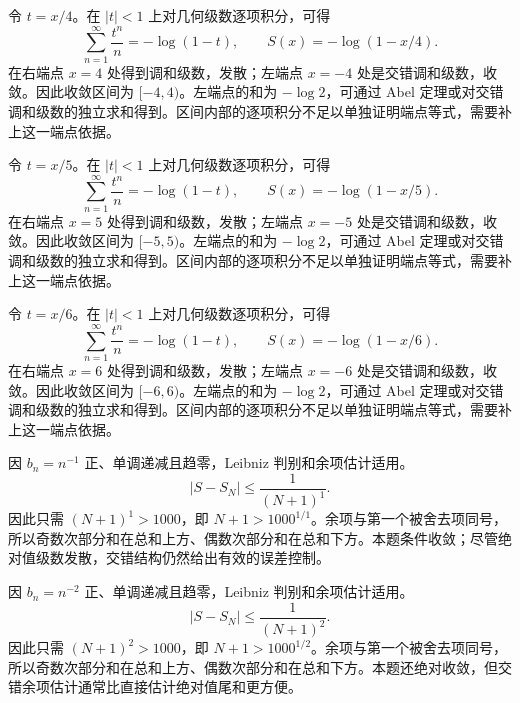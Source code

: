\documentclass[12pt,fontset=fandol]{ctexart}
\begin{document}
\begin{solve}\label{ans:c26q17}
令 $t=x/4$。在 $|t|<1$ 上对几何级数逐项积分，可得
\[
\sum_{n=1}^\infty\frac{t^n}n=-\log(1-t),\qquad S(x)=-\log(1-x/4).
\]
在右端点 $x=4$ 处得到调和级数，发散；左端点 $x=-4$ 处是交错调和级数，收敛。因此收敛区间为 $[-4,4)$。左端点的和为 $-\log2$，可通过 Abel 定理或对交错调和级数的独立求和得到。区间内部的逐项积分不足以单独证明端点等式，需要补上这一端点依据。
\end{solve}

\begin{solve}\label{ans:c26q18}
令 $t=x/5$。在 $|t|<1$ 上对几何级数逐项积分，可得
\[
\sum_{n=1}^\infty\frac{t^n}n=-\log(1-t),\qquad S(x)=-\log(1-x/5).
\]
在右端点 $x=5$ 处得到调和级数，发散；左端点 $x=-5$ 处是交错调和级数，收敛。因此收敛区间为 $[-5,5)$。左端点的和为 $-\log2$，可通过 Abel 定理或对交错调和级数的独立求和得到。区间内部的逐项积分不足以单独证明端点等式，需要补上这一端点依据。
\end{solve}

\begin{solve}\label{ans:c26q19}
令 $t=x/6$。在 $|t|<1$ 上对几何级数逐项积分，可得
\[
\sum_{n=1}^\infty\frac{t^n}n=-\log(1-t),\qquad S(x)=-\log(1-x/6).
\]
在右端点 $x=6$ 处得到调和级数，发散；左端点 $x=-6$ 处是交错调和级数，收敛。因此收敛区间为 $[-6,6)$。左端点的和为 $-\log2$，可通过 Abel 定理或对交错调和级数的独立求和得到。区间内部的逐项积分不足以单独证明端点等式，需要补上这一端点依据。
\end{solve}

\begin{solve}\label{ans:c26q20}
因 $b_n=n^{-1}$ 正、单调递减且趋零，Leibniz 判别和余项估计适用。
\[
|S-S_N|\le\frac1{(N+1)^{1}}.
\]
因此只需 $(N+1)^{1}>1000$，即 $N+1>1000^{1/1}$。余项与第一个被舍去项同号，所以奇数次部分和在总和上方、偶数次部分和在总和下方。本题条件收敛；尽管绝对值级数发散，交错结构仍然给出有效的误差控制。
\end{solve}

\begin{solve}\label{ans:c26q21}
因 $b_n=n^{-2}$ 正、单调递减且趋零，Leibniz 判别和余项估计适用。
\[
|S-S_N|\le\frac1{(N+1)^{2}}.
\]
因此只需 $(N+1)^{2}>1000$，即 $N+1>1000^{1/2}$。余项与第一个被舍去项同号，所以奇数次部分和在总和上方、偶数次部分和在总和下方。本题还绝对收敛，但交错余项估计通常比直接估计绝对值尾和更方便。
\end{solve}
\end{document}
